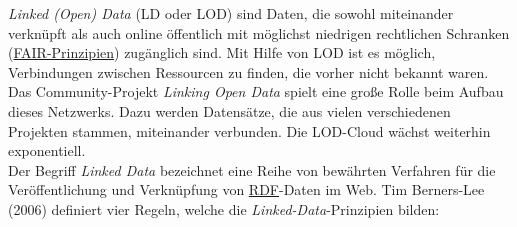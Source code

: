 \documentclass{article}
\begin{document}
    \emph{Linked (Open) Data} (LD oder LOD) sind Daten, die sowohl miteinander verknüpft als auch online öffentlich mit möglichst niedrigen rechtlichen Schranken (\href{http://gams.uni-graz.at/o:konde.7}{FAIR-Prinzipien}) zugänglich sind. Mit Hilfe von LOD ist es möglich, Verbindungen zwischen Ressourcen zu finden, die vorher nicht bekannt waren. Das Community-Projekt \emph{Linking Open Data} spielt eine große Rolle beim Aufbau dieses Netzwerks. Dazu werden Datensätze, die aus vielen verschiedenen Projekten stammen, miteinander verbunden. Die LOD-Cloud wächst weiterhin exponentiell.\\
            
        Der Begriff \emph{Linked Data} bezeichnet eine Reihe von bewährten Verfahren für die Veröffentlichung und Verknüpfung von \href{http://gams.uni-graz.at/o:konde.131}{RDF}-Daten im Web. Tim Berners-Lee (2006) definiert vier Regeln, welche die \emph{Linked-Data}-Prinzipien bilden: \\
            
\end{document}
